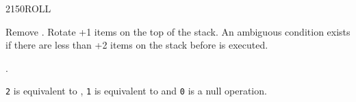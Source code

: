 \begin{worddef}{2150}{ROLL}
\item {}

	Remove . Rotate +1 items on the top of the stack.
	An ambiguous condition exists if there are less than +2
	items on the stack before  is executed.

\see {}.

	\begin{rationale} %
		\texttt{2}  is equivalent to ,
		\texttt{1}  is equivalent to  and
		\texttt{0}  is a null operation.
	\end{rationale}
\end{worddef}


